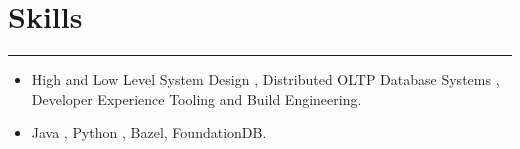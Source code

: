 \section*{Skills}
\hrule
\vspace{0.3cm}
\begin{itemize}[label=\textperiodcentered,labelindent=0pt,itemindent=1em,leftmargin=0.3cm,itemsep=0pt]
    \item High and Low Level System Design , Distributed OLTP Database Systems , 
    Developer Experience Tooling and Build Engineering.
    \item Java , Python , Bazel, FoundationDB.
\end{itemize}
